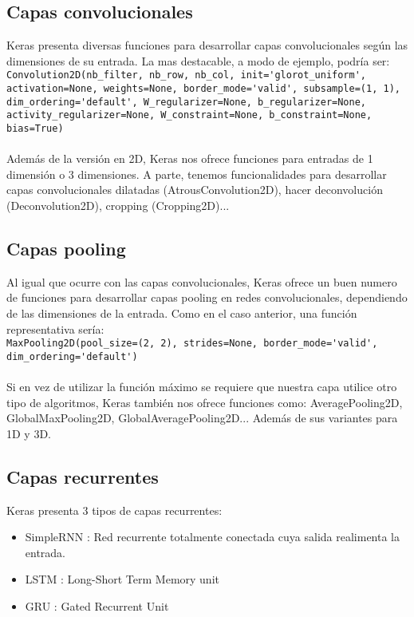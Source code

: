 \subsection{Capas convolucionales}
Keras presenta diversas funciones para desarrollar capas convolucionales según las dimensiones de su entrada. La mas destacable, a modo de ejemplo, podría ser:\\
\lstinline{Convolution2D(nb_filter, nb_row, nb_col, init='glorot_uniform', activation=None, weights=None, border_mode='valid', subsample=(1, 1), dim_ordering='default', W_regularizer=None, b_regularizer=None, activity_regularizer=None, W_constraint=None, b_constraint=None, bias=True)}\\\\
Además de la versión en 2D, Keras nos ofrece funciones para entradas de 1 dimensión o 3 dimensiones. A parte, tenemos funcionalidades para desarrollar capas convolucionales dilatadas (AtrousConvolution2D), hacer deconvolución (Deconvolution2D), cropping (Cropping2D)...
\subsection{Capas pooling}
Al igual que ocurre con las capas convolucionales, Keras ofrece un buen numero de funciones para desarrollar capas pooling en redes convolucionales, dependiendo de las dimensiones de la entrada. Como en el caso anterior, una función representativa sería:\\
\lstinline{MaxPooling2D(pool_size=(2, 2), strides=None, border_mode='valid', dim_ordering='default')}\\\\
Si en vez de utilizar la función máximo se requiere que nuestra capa utilice otro tipo de algoritmos, Keras también nos ofrece funciones como: AveragePooling2D, GlobalMaxPooling2D, GlobalAveragePooling2D... Además de sus variantes para 1D y 3D.
\subsection{Capas recurrentes}
Keras presenta 3 tipos de capas recurrentes:
\begin{itemize}[noitemsep]
\item SimpleRNN : Red recurrente totalmente conectada cuya salida realimenta la entrada.
\item LSTM : Long-Short Term Memory unit
\item GRU : Gated Recurrent Unit
\end{itemize}

